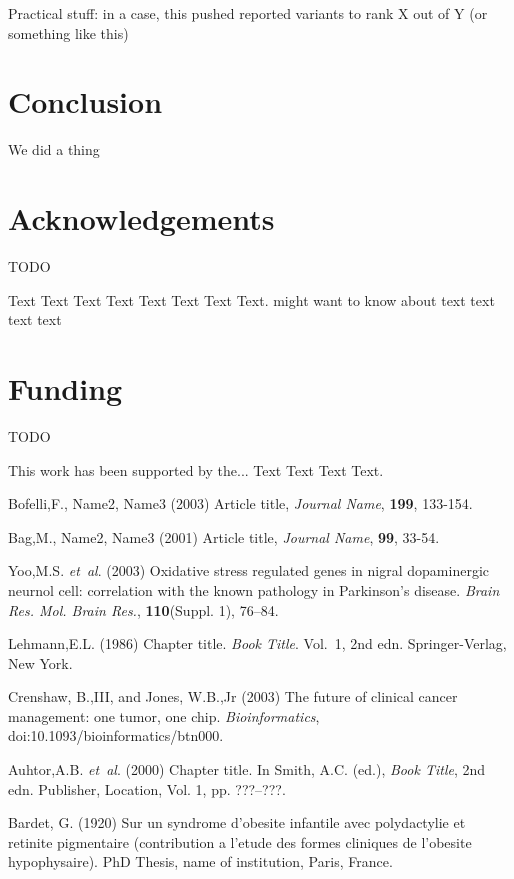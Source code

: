 \documentclass{bioinfo}
\begin{document}
Practical stuff: in a case, this pushed reported variants to rank X out of Y (or something like this)

\section{Conclusion}

We did a thing

\section*{Acknowledgements}
TODO

Text Text Text Text Text Text  Text Text.  \citealp{Boffelli03} might want to know about  text
text text text\vspace*{-12pt}

\section*{Funding}
TODO

This work has been supported by the... Text Text  Text Text.\vspace*{-12pt}

%
%
%
%
%
%
%
%
%


\begin{thebibliography}{}

Bofelli,F., Name2, Name3 (2003) Article title, {\it Journal Name}, {\bf 199}, 133-154.

Bag,M., Name2, Name3 (2001) Article title, {\it Journal Name}, {\bf 99}, 33-54.

Yoo,M.S. \textit{et~al}. (2003) Oxidative stress regulated genes
in nigral dopaminergic neurnol cell: correlation with the known
pathology in Parkinson's disease. \textit{Brain Res. Mol. Brain
Res.}, \textbf{110}(Suppl. 1), 76--84.

Lehmann,E.L. (1986) Chapter title. \textit{Book Title}. Vol.~1, 2nd edn. Springer-Verlag, New York.

Crenshaw, B.,III, and Jones, W.B.,Jr (2003) The future of clinical
cancer management: one tumor, one chip. \textit{Bioinformatics},
doi:10.1093/bioinformatics/btn000.

Auhtor,A.B. \textit{et~al}. (2000) Chapter title. In Smith, A.C.
(ed.), \textit{Book Title}, 2nd edn. Publisher, Location, Vol. 1, pp.
???--???.

Bardet, G. (1920) Sur un syndrome d'obesite infantile avec
polydactylie et retinite pigmentaire (contribution a l'etude des
formes cliniques de l'obesite hypophysaire). PhD Thesis, name of
institution, Paris, France.

\end{thebibliography}
\end{document}
